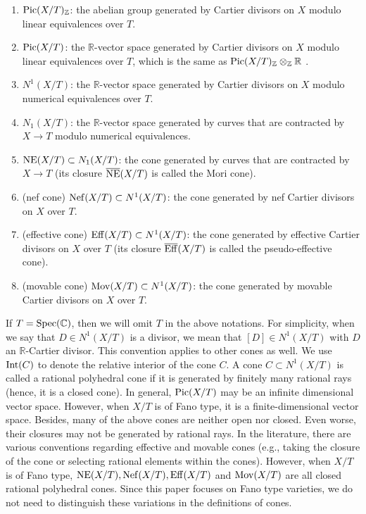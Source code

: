 \documentclass[11pt,oneside,reqno]{amsart}
\numberwithin{equation}{section}
\theoremstyle{definition}
\newcommand{\Spec}{{\rm {Spec}}}
\newcommand{\Pic}{{\rm {Pic}}}
\newcommand{\Nef}{{\rm {Nef}}}
\newcommand{\Eff}{{\rm {Eff}}}
\newcommand{\Mov}{{\rm {Mov}}}
\newcommand{\NE}{{\rm {NE}}}
\newcommand{\bEff}{\overline{\rm {Eff}}}
\newcommand{\bC}{\mathbb{C}}
\newcommand{\bR}{\mathbb{R}}
\newcommand{\bZ}{\mathbb{Z}}
\begin{document}
\begin{enumerate}
\item $\Pic(X/T)_{\bZ}$: the abelian group generated by Cartier divisors on $X$ modulo linear equivalences over $T$.
\item $\Pic(X/T)$: the $\bR$-vector space generated by Cartier divisors on $X$ modulo linear equivalences over $T$, which is the same as $\Pic(X/T)_{\bZ}\otimes_{\bZ} \bR$ . 

\item $N^1(X/T)$: the $\bR$-vector space generated by Cartier divisors on $X$ modulo numerical equivalences over $T$. 

\item $N_1(X/T)$: the $\bR$-vector space generated by curves that are contracted by $X\to T$ modulo numerical equivalences. 
 
\item $\NE(X/T)\subset N_1(X/T)$: the cone generated by curves that are contracted by $X\to T$ (its closure $\overline{\NE}(X/T)$ is called the Mori cone). 


\item (nef cone) $\Nef(X/T)\subset N^1(X/T)$: the cone generated by nef Cartier divisors on $X$ over $T$. 


\item (effective cone) $\Eff(X/T)\subset N^1(X/T)$: the cone generated by effective Cartier divisors on $X$ over $T$ (its closure $\bEff(X/T)$ is called the pseudo-effective cone).

\item (movable cone) $\Mov(X/T)\subset N^1(X/T)$: the cone generated by movable Cartier divisors on $X$ over $T$. 
\end{enumerate}

If $T=\Spec (\bC)$, then we will omit $T$ in the above notations. For simplicity, when we say that $D \in N^1(X/T)$ is a divisor, we mean that $[D] \in N^1(X/T)$ with $D$ an $\bR$-Cartier divisor. This convention applies to other cones as well. We use ${\rm Int}(C)$ to denote the relative interior of the cone $C$. A cone $C\subset N^1(X/T)$ is called a rational polyhedral cone if it is generated by finitely many rational rays (hence, it is a closed cone). In general, $\Pic(X/T)$ may be an infinite dimensional vector space. However, when $X/T$ is of Fano type, it is a finite-dimensional vector space. Besides, many of the above cones are neither open nor closed. Even worse, their closures may not be generated by rational rays. In the literature, there are various conventions regarding effective and movable cones (e.g., taking the closure of the cone or selecting rational elements within the cones). However, when $X/T$ is of Fano type, $\NE(X/T), \Nef(X/T), \Eff(X/T)$ and $\Mov(X/T)$ are all closed rational polyhedral cones. 
Since this paper focuses on Fano type varieties, we do not need to distinguish these variations in the definitions of cones.
\end{document}
